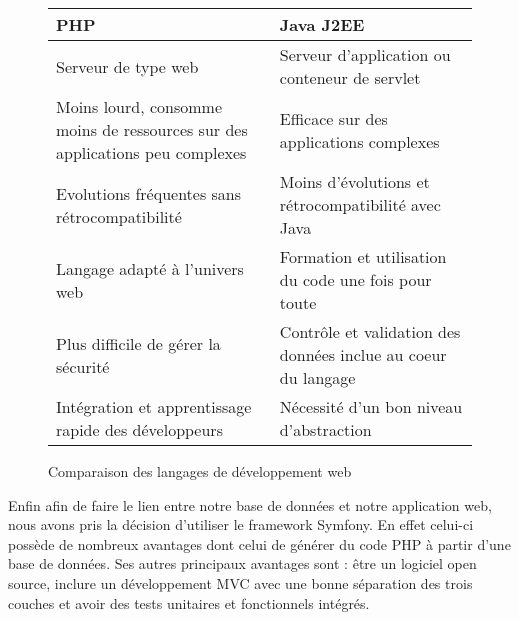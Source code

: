 \documentclass[asi]{picInsa}
\begin{document}
\begin{figure}[!h]
\begin{center}
    \begin{tabular}[h]{|p{}|p{}|}
    
	\hline
	\cellcolor{blue!15}PHP & \cellcolor{blue!15}Java J2EE \\\hline
        Serveur de type web & Serveur d'application ou conteneur de servlet \\\hline
        Moins lourd, consomme moins de ressources sur des applications peu complexes & Efficace sur des applications complexes \\\hline
        Evolutions fréquentes sans rétrocompatibilité & Moins d'évolutions et rétrocompatibilité avec Java \\\hline
        Langage adapté à l'univers web & Formation et utilisation du code une fois pour toute \\\hline
        Plus difficile de gérer la sécurité & Contrôle et validation des données inclue au coeur du langage \\\hline
        Intégration et apprentissage rapide des développeurs & Nécessité d'un bon niveau d'abstraction \\\hline
    \end{tabular}
    \caption{Comparaison des langages de développement web}
    \label{comparaison_PHP}
\end{center}
\end{figure}

Enfin afin de faire le lien entre notre base de données et notre application web, nous avons pris la décision d'utiliser le framework Symfony. En effet celui-ci possède de nombreux avantages dont celui de générer du code PHP à partir d'une base de données. Ses autres principaux avantages sont : être un logiciel open source, inclure un développement MVC avec une bonne séparation des trois couches et avoir des tests unitaires et fonctionnels intégrés.
\end{document}
